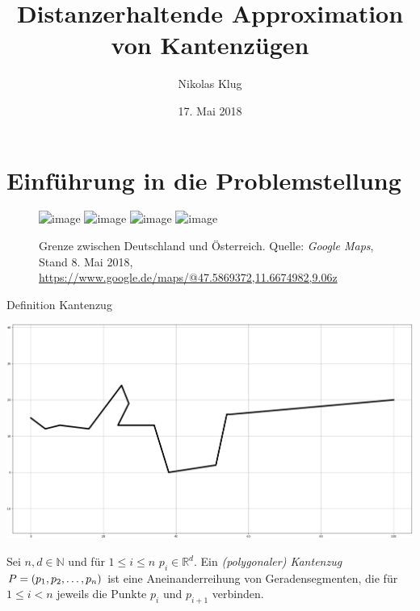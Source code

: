 \documentclass{beamer}
\title[Distanzerhaltende Approximation]{Distanzerhaltende Approximation von Kantenzügen}
\author[N. Klug]{Nikolas Klug}
\institute[Uni Augburg]{Universität Augsburg}
\date{17. Mai 2018}
\begin{document}
	\frame{\titlepage}
	
	\section{Einführung in die Problemstellung}
	\begin{frame}

		\begin{figure}
			\includegraphics<1>[height=0.8\textheight]{maps_zoom4.png}
			\includegraphics<2>[height=0.8\textheight]{maps_zoom3.png}
			\includegraphics<3>[height=0.8\textheight]{maps_zoom2.png}
			\includegraphics<4>[height=0.8\textheight]{maps_zoom1_red_box.png}

			\caption{\tiny{Grenze zwischen Deutschland und Österreich. Quelle: \emph{Google Maps}, Stand 8. Mai 2018, \href{https://www.google.de/maps/@47.5869372,11.6674982,9.06z}{https://www.google.de/maps/@47.5869372,11.6674982,9.06z}}}
		\end{figure}
		
	\end{frame}
	
	\begin{frame}{Definition Kantenzug}

		\centering
		\includegraphics[height=0.6\textheight]{raw_path.png}
		
		\begin{definition}
			Sei $n, d \in \mathbb{N}$ und für $1 \leq i \leq n$ $p_i \in \mathbb{R}^d$.
			Ein \emph{(polygonaler) Kantenzug} $P = (p_1, p_2, \mathellipsis, p_n)$ ist eine Aneinanderreihung von Geradensegmenten, die für $1 \leq i < n$ jeweils die Punkte $p_i$ und $p_{i+1}$ verbinden. 

		\end{definition}
	\end{frame}
	
\end{document}
